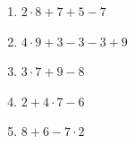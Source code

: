 \begin{enumerate}
\renewcommand{\labelenumi}{\textbf{\arabic{enumi})}}
\setlength{\itemsep}{0pt}
\medmuskip=4mu\thickmuskip=5mu
\item $\displaystyle 2\cdot 8+7+5-7$
\par\vspace{3cm}
\item $\displaystyle 4\cdot 9+3-3-3+9$
\par\vspace{3cm}
\item $\displaystyle 3\cdot 7+9-8$
\par\vspace{3cm}
\item $\displaystyle 2+4\cdot 7-6$
\par\vspace{3cm}
\item $\displaystyle 8+6-7\cdot 2$
\par\vspace{3cm}
\end{enumerate}
